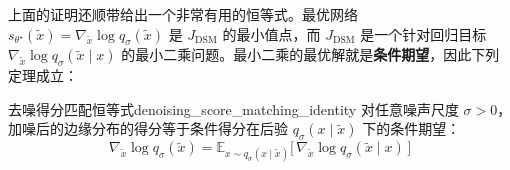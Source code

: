 上面的证明还顺带给出一个非常有用的恒等式。最优网络 $s_{\theta^\star}(\tilde x) = \nabla_{\tilde x}\log q_\sigma(\tilde x)$ 是 $J_{\text{DSM}}$ 的最小值点，而 $J_{\text{DSM}}$ 是一个针对回归目标 $\nabla_{\tilde x}\log q_\sigma(\tilde x\mid x)$ 的最小二乘问题。最小二乘的最优解就是\textbf{条件期望}，因此下列定理成立：
\begin{theorem}{去噪得分匹配恒等式}{denoising_score_matching_identity}
    对任意噪声尺度 $\sigma > 0$，加噪后的边缘分布的得分等于条件得分在后验 $q_\sigma(x\mid\tilde x)$ 下的条件期望：
\begin{equation}\label{eq:denoising_score_matching_identity}
\nabla_{\tilde x}\log q_\sigma(\tilde x)
= \mathbb{E}_{x \sim q_\sigma(x\mid \tilde x)}\big[\, \nabla_{\tilde x}\log q_\sigma(\tilde x\mid x)\,\big]
\end{equation}
\end{theorem}

